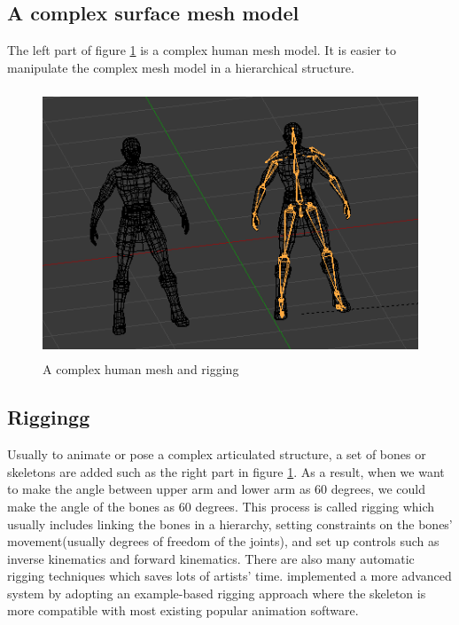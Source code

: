 \subsection{A complex surface mesh model}
The left part of figure \ref{fig:rigging} is a complex human mesh model. It is easier to manipulate the complex mesh model in a hierarchical structure.
\begin{figure}[ht!]
\centering
\includegraphics[height=8cm]{figures/rigging.png}
\caption{A complex human mesh and rigging \protect\cite{shaolinpic}}
\label{fig:rigging}
\end{figure}

\subsection{Riggingg} %
\label{sub:rigging}

Usually to animate or pose a complex articulated structure, a set of
bones or skeletons are added such as the right part in figure \ref{fig:rigging}.  As a result, when we want to make the angle between 
upper arm and lower arm as 60 degrees, we could make the angle of the bones as 60 degrees.
This process is called rigging which
usually includes linking the bones in a hierarchy,
setting constraints on the bones' movement(usually degrees of freedom
of the joints), and set up controls such
as inverse kinematics and forward kinematics.
There are also many automatic rigging techniques which saves lots of
artists' time.   \cite{Rigging2}  implemented a more advanced system by adopting an example-based rigging approach where the skeleton is more compatible with most existing popular animation software.

